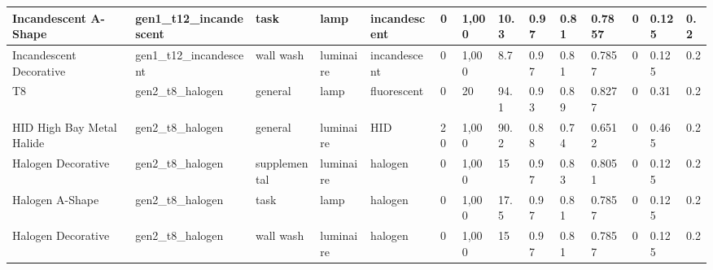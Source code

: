 \begin{center}
\begin{landscape}
\begin{longtable}{|p{0.75in}|p{0.65in}|p{0.47in}|p{0.4in}|p{0.45in}|p{0.4in}|p{0.4in}|p{0.4in}|p{0.4in}|p{0.4in}|p{0.4in}|p{0.4in}|p{0.4in}|p{0.4in}|}
  Incandescent A-Shape       & gen1\_t12\_incandescent & task                   & lamp          & incandescent            & 0                     & 1,000                  & 10.3                            & 0.97                    & 0.81                        & 0.7857               & 0                   & 0.125            & 0.2              \\ \hline
  Incandescent Decorative    & gen1\_t12\_incandescent & wall wash              & luminaire     & incandescent            & 0                     & 1,000                  & 8.7                             & 0.97                    & 0.81                        & 0.7857               & 0                   & 0.125            & 0.2              \\ \hline
  T8                         & gen2\_t8\_halogen       & general                & lamp          & fluorescent             & 0                     & 20                    & 94.1                            & 0.93                    & 0.89                        & 0.8277               & 0                   & 0.31             & 0.2              \\ \hline
  HID High Bay Metal Halide  & gen2\_t8\_halogen       & general                & luminaire     & HID                     & 20                    & 1,000                  & 90.2                            & 0.88                    & 0.74                        & 0.6512               & 0                   & 0.465            & 0.2              \\ \hline
  Halogen Decorative         & gen2\_t8\_halogen       & supplemental           & luminaire     & halogen                 & 0                     & 1,000                  & 15                              & 0.97                    & 0.83                        & 0.8051               & 0                   & 0.125            & 0.2              \\ \hline
  Halogen A-Shape            & gen2\_t8\_halogen       & task                   & lamp          & halogen                 & 0                     & 1,000                  & 17.5                            & 0.97                    & 0.81                        & 0.7857               & 0                   & 0.125            & 0.2              \\ \hline
  Halogen Decorative         & gen2\_t8\_halogen       & wall wash              & luminaire     & halogen                 & 0                     & 1,000                  & 15                              & 0.97                    & 0.81                        & 0.7857               & 0                   & 0.125            & 0.2              \\ \hline

\end{longtable}
\end{landscape}
\end{center}
